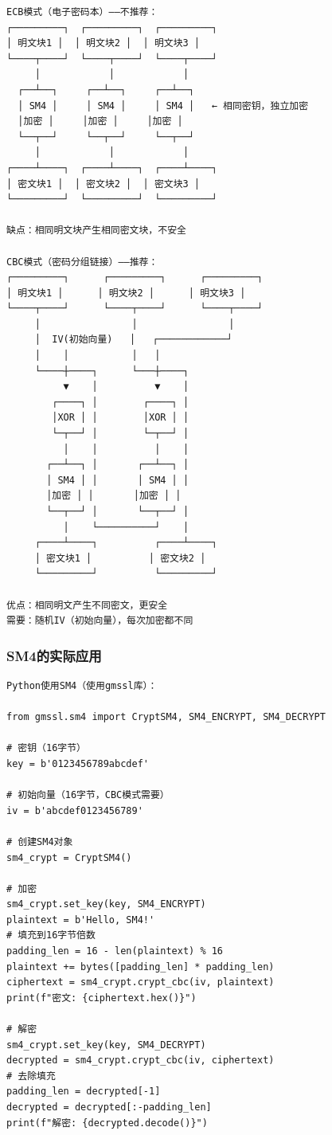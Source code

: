 ﻿\documentclass[12pt,a4paper]{article}
\begin{document}
\begin{lstlisting}
ECB模式（电子密码本）——不推荐：
┌─────────┐  ┌─────────┐  ┌─────────┐
│ 明文块1 │  │ 明文块2 │  │ 明文块3 │
└────┬────┘  └────┬────┘  └────┬────┘
     │            │            │
  ┌──┴──┐     ┌──┴──┐     ┌──┴──┐
  │ SM4 │     │ SM4 │     │ SM4 │   ← 相同密钥，独立加密
  │加密 │     │加密 │     │加密 │
  └──┬──┘     └──┬──┘     └──┬──┘
     │            │            │
┌────┴────┐  ┌────┴────┐  ┌────┴────┐
│ 密文块1 │  │ 密文块2 │  │ 密文块3 │
└─────────┘  └─────────┘  └─────────┘

缺点：相同明文块产生相同密文块，不安全

CBC模式（密码分组链接）——推荐：
┌─────────┐      ┌─────────┐      ┌─────────┐
│ 明文块1 │      │ 明文块2 │      │ 明文块3 │
└────┬────┘      └────┬────┘      └────┬────┘
     │                │                │
     │  IV(初始向量)   │   ┌────────────┘
     │    │           │   │
     └────┼────┐      └───┼────┐
          ▼    │          ▼    │
        ┌────┐ │        ┌────┐ │
        │XOR │ │        │XOR │ │
        └─┬──┘ │        └─┬──┘ │
          │    │          │    │
       ┌──┴──┐ │       ┌──┴──┐ │
       │ SM4 │ │       │ SM4 │ │
       │加密 │ │       │加密 │ │
       └──┬──┘ │       └──┬──┘ │
          │    └──────────┘    │
     ┌────┴────┐          ┌────┴────┐
     │ 密文块1 │          │ 密文块2 │
     └─────────┘          └─────────┘

优点：相同明文产生不同密文，更安全
需要：随机IV（初始向量），每次加密都不同
\end{lstlisting}

\subsubsection{SM4的实际应用}

\begin{lstlisting}
Python使用SM4（使用gmssl库）：

from gmssl.sm4 import CryptSM4, SM4_ENCRYPT, SM4_DECRYPT

# 密钥（16字节）
key = b'0123456789abcdef'

# 初始向量（16字节，CBC模式需要）
iv = b'abcdef0123456789'

# 创建SM4对象
sm4_crypt = CryptSM4()

# 加密
sm4_crypt.set_key(key, SM4_ENCRYPT)
plaintext = b'Hello, SM4!'
# 填充到16字节倍数
padding_len = 16 - len(plaintext) % 16
plaintext += bytes([padding_len] * padding_len)
ciphertext = sm4_crypt.crypt_cbc(iv, plaintext)
print(f"密文: {ciphertext.hex()}")

# 解密
sm4_crypt.set_key(key, SM4_DECRYPT)
decrypted = sm4_crypt.crypt_cbc(iv, ciphertext)
# 去除填充
padding_len = decrypted[-1]
decrypted = decrypted[:-padding_len]
print(f"解密: {decrypted.decode()}")
\end{lstlisting}
\end{document}
